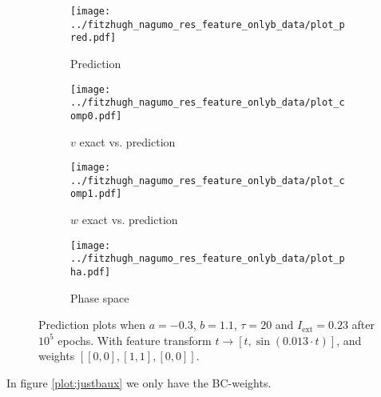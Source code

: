 \documentclass[a4paper]{article}
\begin{document}
\begin{figure}[H]
	\centering 
	\begin{subfigure}[b]{0.47\textwidth}
		\centering
		\texttt{[image: ../fitzhugh\_nagumo\_res\_feature\_onlyb\_data/plot\_pred.pdf]}
		\caption{Prediction}
		\label{fig:justbdataa}
	\end{subfigure}
	\begin{subfigure}[b]{0.47\textwidth}
		\centering
		\texttt{[image: ../fitzhugh\_nagumo\_res\_feature\_onlyb\_data/plot\_comp0.pdf]}
		\caption{$v$ exact vs. prediction}
		\label{fig:justbdatab}
	\end{subfigure}
	\begin{subfigure}[b]{0.47\textwidth}
		\centering
		\texttt{[image: ../fitzhugh\_nagumo\_res\_feature\_onlyb\_data/plot\_comp1.pdf]}
		\caption{$w$ exact vs. prediction}
		\label{fig:justbdatac}
	\end{subfigure}
	\begin{subfigure}[b]{0.47\textwidth}
		\centering
		\texttt{[image: ../fitzhugh\_nagumo\_res\_feature\_onlyb\_data/plot\_pha.pdf]}
		\caption{Phase space}
		\label{fig:justbdatad}
	\end{subfigure}
	\caption{Prediction plots when $a=-0.3$, $b=1.1$, $\tau=20$ and $ I_{\text{ext}}=0.23$ after $10^5$ epochs. With feature transform $t \rightarrow \left[ t, \sin(0.013\cdot t) \right] $, and weights $\left[ \left[ 0, 0\right],\left[ 1, 1\right],  \left[ 0, 0\right] \right]$.}
	\label{plot:justbdata}
\end{figure} 	


In figure \ref{plot:justbaux} we only have the BC-weights. 
\end{document}
